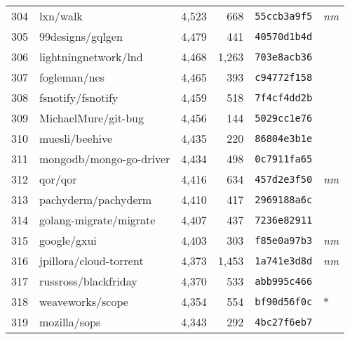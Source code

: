 {\begin{supertabular}{llrrll}
        304 &                           lxn/walk &  4,523 &    668 &  \texttt{55ccb3a9f5} &  \textit{nm} \\
        305 &                   99designs/gqlgen &  4,479 &    441 &  \texttt{40570d1b4d} &              \\
        306 &               lightningnetwork/lnd &  4,468 &  1,263 &  \texttt{703e8acb36} &              \\
        307 &                       fogleman/nes &  4,465 &    393 &  \texttt{c94772f158} &              \\
        308 &                  fsnotify/fsnotify &  4,459 &    518 &  \texttt{7f4cf4dd2b} &              \\
        309 &                MichaelMure/git-bug &  4,456 &    144 &  \texttt{5029cc1e76} &              \\
        310 &                     muesli/beehive &  4,435 &    220 &  \texttt{86804e3b1e} &              \\
        311 &            mongodb/mongo-go-driver &  4,434 &    498 &  \texttt{0c7911fa65} &              \\
        312 &                            qor/qor &  4,416 &    634 &  \texttt{457d2e3f50} &  \textit{nm} \\
        313 &                pachyderm/pachyderm &  4,410 &    417 &  \texttt{2969188a6c} &              \\
        314 &             golang-migrate/migrate &  4,407 &    437 &  \texttt{7236e82911} &              \\
        315 &                        google/gxui &  4,403 &    303 &  \texttt{f85e0a97b3} &  \textit{nm} \\
        316 &             jpillora/cloud-torrent &  4,373 &  1,453 &  \texttt{1a741e3d8d} &  \textit{nm} \\
        317 &               russross/blackfriday &  4,370 &    533 &  \texttt{abb995c466} &              \\
        318 &                   weaveworks/scope &  4,354 &    554 &  \texttt{bf90d56f0c} &            * \\
        319 &                       mozilla/sops &  4,343 &    292 &  \texttt{4bc27f6eb7} &              \\

\end{supertabular}}
